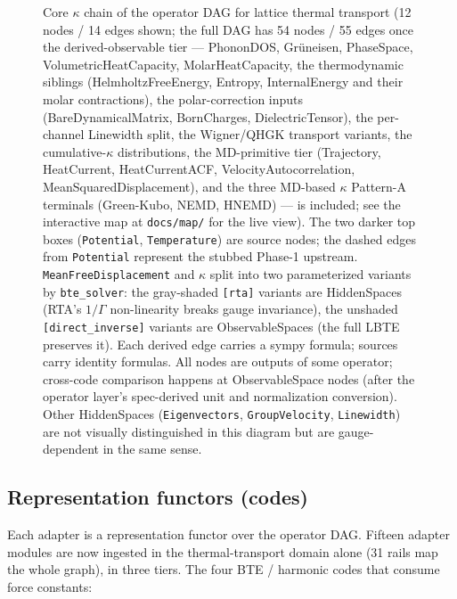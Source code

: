 \documentclass[11pt,a4paper]{article}
\begin{document}
\begin{figure}[t]
{\begin{tikzpicture}
\end{tikzpicture}%
}
\caption{Core $\kappa$ chain of the operator DAG for lattice thermal transport
(12 nodes / 14 edges shown; the full DAG has 54 nodes / 55 edges once the
derived-observable tier --- PhononDOS, Grüneisen, PhaseSpace, VolumetricHeatCapacity,
MolarHeatCapacity, the thermodynamic siblings (HelmholtzFreeEnergy, Entropy,
InternalEnergy and their molar contractions), the polar-correction inputs
(BareDynamicalMatrix, BornCharges, DielectricTensor), the per-channel
Linewidth split, the Wigner/QHGK transport variants, the cumulative-$\kappa$
distributions, the MD-primitive tier (Trajectory, HeatCurrent, HeatCurrentACF,
VelocityAutocorrelation, MeanSquaredDisplacement), and the three MD-based
$\kappa$ Pattern-A terminals (Green-Kubo, NEMD, HNEMD) --- is included; see
the interactive map at \texttt{docs/map/} for the live view). The
two darker top boxes (\texttt{Potential}, \texttt{Temperature}) are source nodes;
the dashed edges from \texttt{Potential} represent the stubbed Phase-1 upstream.
\texttt{MeanFreeDisplacement} and $\kappa$ split into two parameterized variants by
\texttt{bte\_solver}: the gray-shaded \texttt{[rta]} variants are HiddenSpaces
(RTA's $1/\Gamma$ non-linearity breaks gauge invariance), the unshaded
\texttt{[direct\_inverse]} variants are ObservableSpaces (the full LBTE preserves it).
Each derived edge carries a sympy formula; sources carry identity formulas. All
nodes are outputs of some operator; cross-code comparison happens at ObservableSpace
nodes (after the operator layer's spec-derived unit and normalization conversion). Other
HiddenSpaces (\texttt{Eigenvectors}, \texttt{GroupVelocity}, \texttt{Linewidth})
are not visually distinguished in this diagram but are gauge-dependent in the same
sense.}
\label{fig:dag}
\end{figure}

\subsection{Representation functors (codes)}

Each adapter is a representation functor over the operator DAG. Fifteen
adapter modules are now ingested in the thermal-transport domain alone (31
rails map the whole graph), in three tiers. The four BTE / harmonic codes that consume
force constants:
\end{document}
